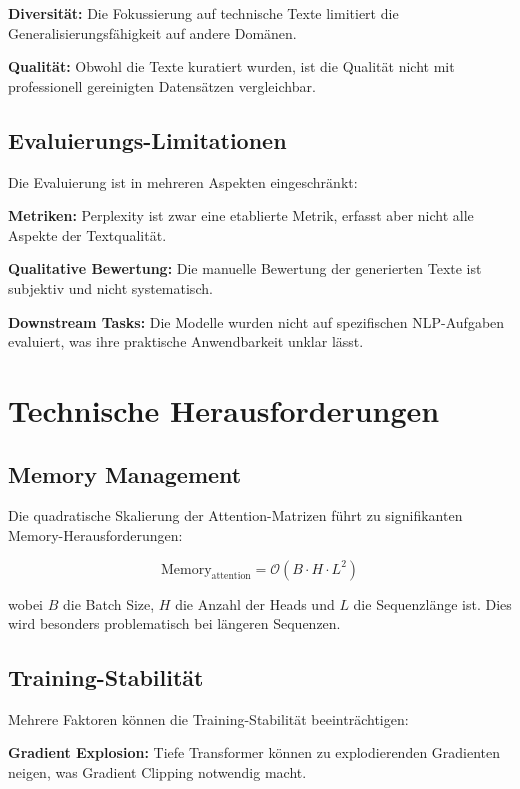 \textbf{Diversität:} Die Fokussierung auf technische Texte limitiert die Generalisierungsfähigkeit auf andere Domänen.

\textbf{Qualität:} Obwohl die Texte kuratiert wurden, ist die Qualität nicht mit professionell gereinigten Datensätzen vergleichbar.

\subsection{Evaluierungs-Limitationen}

Die Evaluierung ist in mehreren Aspekten eingeschränkt:

\textbf{Metriken:} Perplexity ist zwar eine etablierte Metrik, erfasst aber nicht alle Aspekte der Textqualität.

\textbf{Qualitative Bewertung:} Die manuelle Bewertung der generierten Texte ist subjektiv und nicht systematisch.

\textbf{Downstream Tasks:} Die Modelle wurden nicht auf spezifischen NLP-Aufgaben evaluiert, was ihre praktische Anwendbarkeit unklar lässt.

\section{Technische Herausforderungen}

\subsection{Memory Management}

Die quadratische Skalierung der Attention-Matrizen führt zu signifikanten Memory-Herausforderungen:

\begin{equation}
\text{Memory}_{\text{attention}} = \mathcal{O}(B \cdot H \cdot L^2)
\end{equation}

wobei $B$ die Batch Size, $H$ die Anzahl der Heads und $L$ die Sequenzlänge ist. Dies wird besonders problematisch bei längeren Sequenzen.

\subsection{Training-Stabilität}

Mehrere Faktoren können die Training-Stabilität beeinträchtigen:

\textbf{Gradient Explosion:} Tiefe Transformer können zu explodierenden Gradienten neigen, was Gradient Clipping notwendig macht.

